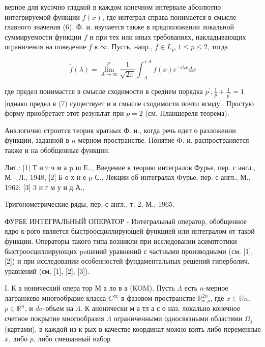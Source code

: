 \documentclass[10pt]{article}
\begin{document}
верное для кусочно гладкой в каждом конечном интервале абсолютно интегрируемой функции $f(x)$, где интеграл справа понимается в смысле главного значения (6). Ф. и. изучается также в предположении локальной суммируемости функции $f$ и при тех или иных требованиях, накладывающих ограничения на поведение $f$ в $\infty$. Пусть, напр., $f \in L_{p}, 1 \leqslant p \leqslant 2$, тогда



\[

\tilde{f}(\lambda)=\lim _{A \rightarrow \infty}^{p^{\prime}} \frac{1}{\sqrt{2 \pi}} \int_{-A}^{+A} f(x) e^{-i \lambda x} d x

\]



где предел понимастся в смысле сходимости в среднем порядка $p^{\prime}, \frac{1}{p}+\frac{1}{p^{\prime}}=1$ [однако предел в (7) существует и в смысле сходимости почти всюду]. Простую форму приобретает этот результат при $p=2$ (см. Планшереля теорема).



Аналогично строится теория кратных Ф. и., когда речь идет о разложении функции, заданной в $n$-мерном пространстве. Понятие Ф. и. распространяется также и на обобщенные функции.



Лит.: [1] Т и т ч м а $\mathrm{p}$ ш Е.., Введение в теорию интегралов Фурье, пер. с англ., М.-- Л., 1948, [2] Б о х н е p С., Лекции об интегралах Фурье, пер. с англ., М., 1962; [3] 3 и г м у н д А.,

Тригонометрические ряды, пер. с англ., т. 2, М., 1965.



ФУРБЕ ИНТЕГРАЛЬНЫЙ ОПЕРАТОР - Интегральный оператор, обобщенное ядро к-рого является быстроосциллирующей функцией или интегралом от такой функции. Операторы такого типа возникли при исследовании асимптотики быстроосциллирующих peшений уравнений с частными производными (см. [1], [2]) и при исследовании особенностей фундаментальных решений гиперболич. уравнений (см. [1], [2], [3]).



I. К а нонический опера тор М а ло в а (КOM). Пусть $\Lambda$ есть $n$-мерное лагранжево многообразие класса $C^{\infty}$ в фазовом пространстве $\mathbb{R}_{x, p}^{2 n}$, где $x \in \mathbb{R} n$, $p \in \mathbb{R}^{n}$, и $d \sigma$-объем на $\Lambda$. К анонически м а тл а с о наз. локально конечное счетное покрытие многообразия $\Lambda$ ограниченными односвязными областями $\Omega_{j}$ (картами), в каждой из к-рых в качестве координат можно взять либо переменные $x$, либо $p$, либо смешанный набор
\end{document}
